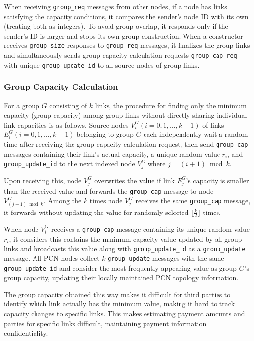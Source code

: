 \documentclass[conference]{IEEEtran}
\newcommand{\groupcap}{\texttt{group\_cap}}
\newcommand{\groupcapreq}{\texttt{group\_cap\_req}}
\newcommand{\groupupdate}{\texttt{group\_update}}
\newcommand{\groupreq}{\texttt{group\_req}}
\newcommand{\groupsize}{\texttt{group\_size}}
\begin{document}
When receiving \groupreq{} messages from other nodes, if a node has links satisfying the capacity conditions, it compares the sender's node ID with its own (treating both as integers). To avoid group overlap, it responds only if the sender's ID is larger and stops its own group construction. When a constructor receives \groupsize{} responses to \groupreq{} messages, it finalizes the group links and simultaneously sends group capacity calculation requests \groupcapreq{} with unique \texttt{group\_update\_id} to all source nodes of group links.

\subsubsection{Group Capacity Calculation}

For a group $G$ consisting of $k$ links, the procedure for finding only the minimum capacity (group capacity) among group links without directly sharing individual link capacities is as follows. Source nodes $V_{i}^{G}(i=0,1,\ldots,k-1)$ of links $E_{i}^{G}(i=0,1,\ldots,k-1)$ belonging to group $G$ each independently wait a random time after receiving the group capacity calculation request, then send \groupcap{} messages containing their link's actual capacity, a unique random value $r_{i}$, and \texttt{group\_update\_id} to the next indexed node $V_{j}^{G}$ where $j=(i+1)\bmod k$.

Upon receiving this, node $V_{j}^{G}$ overwrites the value if link $E_{j}^{G}$'s capacity is smaller than the received value and forwards the \groupcap{} message to node $V_{(j+1)\bmod k}^{G}$. Among the $k$ times node $V_{j}^{G}$ receives the same \groupcap{} message, it forwards without updating the value for randomly selected $\lfloor \frac{k}{2} \rfloor$ times.

When node $V_{i}^{G}$ receives a \groupcap{} message containing its unique random value $r_{i}$, it considers this contains the minimum capacity value updated by all group links and broadcasts this value along with \texttt{group\_update\_id} as a \groupupdate{} message. All PCN nodes collect $k$ \groupupdate{} messages with the same \texttt{group\_update\_id} and consider the most frequently appearing value as group $G$'s group capacity, updating their locally maintained PCN topology information.

The group capacity obtained this way makes it difficult for third parties to identify which link actually has the minimum value, making it hard to track capacity changes to specific links. This makes estimating payment amounts and parties for specific links difficult, maintaining payment information confidentiality.
\end{document}

